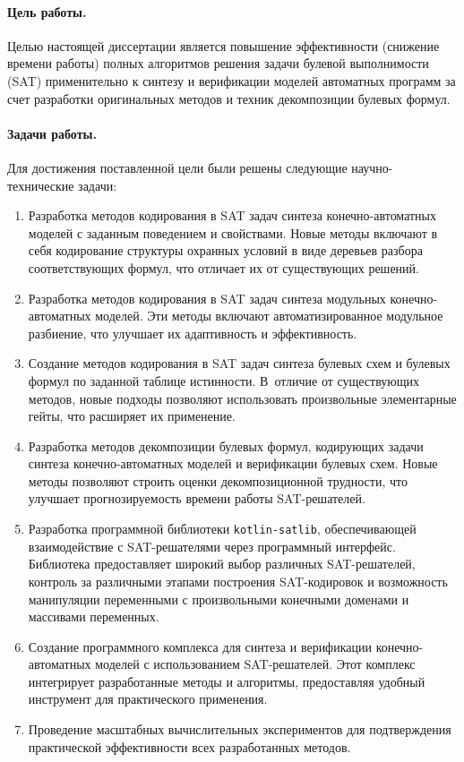 
%
%
\paragraph{Цель работы.}
%
Целью настоящей диссертации является повышение эффективности (снижение времени работы) полных алгоритмов решения задачи булевой выполнимости (SAT) применительно к синтезу и верификации моделей автоматных программ за счет разработки оригинальных методов и техник декомпозиции булевых формул.


%
%
\paragraph{Задачи работы.}
%
Для достижения поставленной цели были решены следующие научно-технические задачи:
\begin{enumerate}[beginpenalty=10000]
    \item Разработка методов кодирования в SAT задач синтеза конечно-автоматных моделей с заданным поведением и свойствами. Новые методы включают в себя кодирование структуры охранных условий в виде деревьев разбора соответствующих формул, что отличает их от существующих решений.
    \item Разработка методов кодирования в SAT задач синтеза модульных конечно-автоматных моделей. Эти методы включают автоматизированное модульное разбиение, что улучшает их адаптивность и эффективность.
    \item Создание методов кодирования в SAT задач синтеза булевых схем и булевых формул по заданной таблице истинности. В~отличие от существующих методов, новые подходы позволяют использовать произвольные элементарные гейты, что расширяет их применение.
    \item Разработка методов декомпозиции булевых формул, кодирующих задачи синтеза конечно-автоматных моделей и верификации булевых схем. Новые методы позволяют строить оценки декомпозиционной трудности, что улучшает прогнозируемость времени работы SAT-решателей.
    \item Разработка программной библиотеки \texttt{kotlin-satlib}, обеспечивающей взаимодействие с SAT-решателями через программный интерфейс. Библиотека предоставляет широкий выбор различных SAT-решателей, контроль за различными этапами построения SAT-кодировок и возможность манипуляции переменными с произвольными конечными доменами и массивами переменных.
    \item Создание программного комплекса  для синтеза и верификации конечно-автоматных моделей с использованием SAT-решателей. Этот комплекс интегрирует разработанные методы и алгоритмы, предоставляя удобный инструмент для практического применения.
    \item Проведение масштабных вычислительных экспериментов для подтверждения практической эффективности всех разработанных методов.
\end{enumerate}


